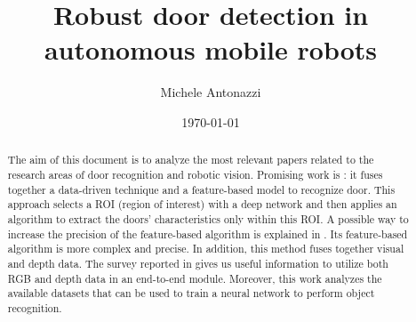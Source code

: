 \documentclass[letterpaper,12pt]{article}
\begin{document}
\title{Robust door detection in autonomous mobile robots}
\author{Michele Antonazzi}
\date{\today}
\maketitle

\begin{abstract}
The aim of this document is to analyze the most relevant papers related to the research areas of door recognition and robotic vision. Promising work is \cite{7942676}: it fuses together a data-driven technique and a feature-based model to recognize door. This approach selects a ROI (region of interest) with a deep network and then applies an algorithm to extract the doors' characteristics only within this ROI. A possible way to increase the precision of the feature-based algorithm is explained in \cite{QUINTANA2018146}. Its feature-based algorithm is more complex and precise. In addition, this method fuses together visual and depth data. The survey reported in \cite{8683987} gives us useful information to utilize both RGB and depth data in an end-to-end module. Moreover, this work analyzes the available datasets that can be used to train a neural network to perform object recognition.
\end{abstract}



\newpage



\end{document}
